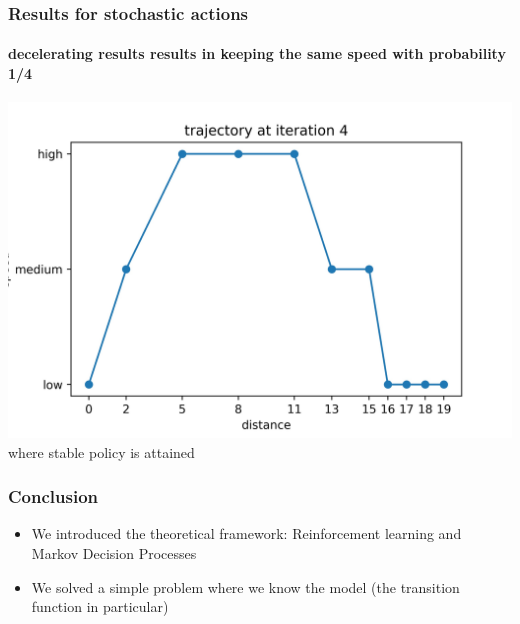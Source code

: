 \documentclass[dvipsnames,svgnames]{beamer}
\begin{document}
\begin{frame}
\frametitle{Results for stochastic actions}
\framesubtitle{decelerating results results in keeping the same speed with probability 1/4}
\centering
\includegraphics[scale=0.5]{img/trajectory4.jpg}\\
\centering
where stable policy is attained 
\end{frame}







\begin{frame}
\frametitle{Conclusion }
\begin{block}{}
\begin{itemize}
\item We introduced the theoretical framework: Reinforcement learning and Markov Decision Processes
\item We solved a simple problem where we know the model (the transition function in particular)
\end{itemize}
\end{block}
\end{frame}
\end{document}
